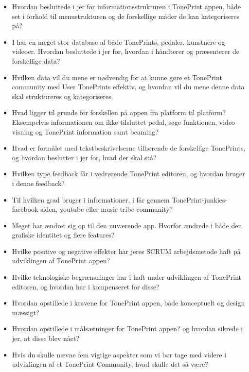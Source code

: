 \begin{itemize}
  \item Hvordan besluttede i jer for informationsstrukturen i TonePrint appen, både set i forhold til menustrukturen og de forskellige måder de kan kategoriseres på?\\
  \item I har en meget stor database af både TonePrints, pedaler, kunstnere og videoer. Hvordan besluttede i jer for,  hvordan i håndterer og præsenterer de forskellige data?\\
  \item Hvilken data vil du mene er nødvendig for at kunne gøre et TonePrint community med User TonePrints effektiv, og hvordan vil du mene denne data skal struktureres og kategoriseres.\\
  \item Hvad ligger til grunde for forskellen på appen fra platform til platform? Eksempelvis informationen om ikke tilsluttet pedal, søge funktionen, video visning og TonePrint information samt beaming?\\
  \item Hvad er formålet med tekstbeskrivelserne tilhørende de forskellige TonePrints, og hvordan beslutter i jer for, hvad der skal stå?\\
\end{itemize}

\begin{itemize}
  \item Hvilken type feedback får i vedrørende TonePrint editoren, og hvordan bruger i denne feedback?\\
  \item Til hvilken grad bruger i informationer, i får gennem TonePrint-junkies-facebook-siden, youtube eller music tribe community?\\ 
  \item Meget har ændret sig op til den nuværende app. Hvorfor ændrede i både den grafiske identitet og flere features?\\
  \item Hvilke positive og negative effekter har jeres SCRUM arbejdsmetode haft på udviklingen af TonePrint appen?\\
  \item Hvilke teknologiske begrænsninger har i haft under udviklingen af TonePrint editoren, og hvordan har i kompenseret for disse?\\
  \item Hvordan opstillede i kravene for TonePrint appen, både konceptuelt og design mæssigt?\\
  \item Hvordan opstillede i målsætninger for TonePrint appen? og hvordan sikrede i jer, at disse blev nået?\\
\end{itemize}

\begin{itemize}
  \item Hvis du skulle nævne fem vigtige aspekter som vi bør tage med videre i udviklingen af et TonePrint Community, hvad skulle det så være?
\end{itemize}